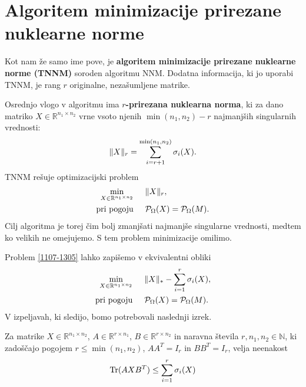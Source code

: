 \section{Algoritem minimizacije prirezane nuklearne norme} \label{2807-1442}
Kot nam že samo ime pove, je \textbf{algoritem minimizacije prirezane nuklearne norme (TNNM)} \cite{TNNM-HZYLH12} soroden algoritmu NNM. Dodatna informacija, ki jo uporabi TNNM, je rang $r$ originalne, nezašumljene matrike.

Osrednjo vlogo v algoritmu ima \textbf{$r$-prirezana nuklearna norma}, ki za dano matriko $X \in \mathbb{R}^{n_1 \times n_2}$ vrne vsoto njenih $\min(n_1,n_2) - r$ najmanjših singularnih vrednosti:
\[
    \lVert X\rVert_r = \sum^{\min(n_1, n_2)}_{i = r + 1} \sigma_i(X).
\]
TNNM rešuje optimizacijski problem
\begin{align}
    \label{1107-1305}
    \begin{split}
        \min_{X\in  \mathbb{R}^{n_1 \times n_2}}              & \hspace{0.5cm} \lVert X\rVert_r, \\
        \textrm{pri pogoju} & \hspace{0.5cm} \mathcal{P}_\Omega(X) = \mathcal{P}_\Omega(M).
    \end{split}
\end{align}
Cilj algoritma je torej čim bolj zmanjšati najmanjše singularne vrednosti, medtem ko velikih ne omejujemo. S tem problem minimizacije omilimo.

Problem \eqref{1107-1305} lahko zapišemo v ekvivalentni obliki
\begin{align}
    \label{2507-0835}
    \begin{split}
        \min_{X\in  \mathbb{R}^{n_1 \times n_2}}              & \hspace{0.5cm} \lVert X\rVert_* - \sum_{i=1}^{r} \sigma_i(X), \\
        \textrm{pri pogoju} & \hspace{0.5cm} \mathcal{P}_\Omega(X) = \mathcal{P}_\Omega(M).
    \end{split}
\end{align}
V izpeljavah, ki sledijo, bomo potrebovali naslednji izrek.

\begin{theorem}
    \label{2507-0850}
    Za matrike $X \in \mathbb{R}^{n_1 \times n_2}$, $A \in \mathbb{R}^{r \times n_1}$, $B \in \mathbb{R}^{r \times n_2}$
    in naravna števila
    $r,n_1,n_2\in \mathbb{N}$,
     ki zadoščajo pogojem $r \leq \min(n_1, n_2)$, $AA^T = I_{r}$  in $BB^T = I_{r}$, velja neenakost
    \begin{align}
        \label{2507-0836}
        \operatorname{Tr}(AXB^T) \leq \sum_{i=1}^{r} \sigma_i(X)
    \end{align}
\end{theorem}

